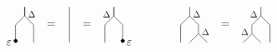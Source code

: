 \begin{equation*}
\begin{tikzpicture}[scale=.28]
\draw (-4,0)--(-4,2)--(-5,3)--(-5,4);
\draw (-6,0)--(-6,2)--(-5,3)--(-5,4);
\node [scale=.8] at (-4.2,3.2) {$\Delta$};
\draw [fill] (-6,.2) circle [radius=.2];
\node [left] at (-6,0) {$\varepsilon$};

\node at (-2,2) {=};
\draw (0,0)--(0,4);
\node at (2,2) {=};

\draw (4,0)--(4,2)--(5,3)--(5,4);
\draw (6,0)--(6,2)--(5,3)--(5,4);
\node [scale=.8] at (4.2,3.2) {$\Delta$};
\draw [fill] (6,.2) circle [radius=.2];
\node [right] at (6,0) {$\varepsilon$};
\end{tikzpicture}
\qquad \qquad
\begin{tikzpicture}[scale=.28]
\node at (0,2){=};
\node at (0,0) {\phantom{$\varepsilon$}};

\draw (2,0)--(3,1)--(3,2)--(4,3)--(4,4);
\draw (4,0)--(3,1);
\draw (4,3)--(5,2)--(5,0);
\node [scale=.8] at (3.2,3.2) {$\Delta$};
\node [scale=.8] at (2.2,1.2) {$\Delta$};

\draw (-2,0)--(-3,1)--(-3,2)--(-4,3)--(-4,4);
\draw (-4,0)--(-3,1);
\draw (-4,3)--(-5,2)--(-5,0);
\node [scale=.8] at (-3.2,3.2) {$\Delta$};
\node [scale=.8] at (-2.2,1.2) {$\Delta$};
\end{tikzpicture}
\end{equation*}